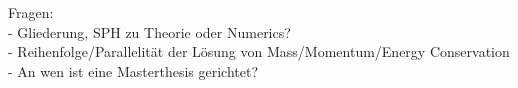 Fragen:\\
- Gliederung, SPH zu Theorie oder Numerics? \\
- Reihenfolge/Parallelität der Lösung von Mass/Momentum/Energy Conservation \\
- An wen ist eine Masterthesis gerichtet?